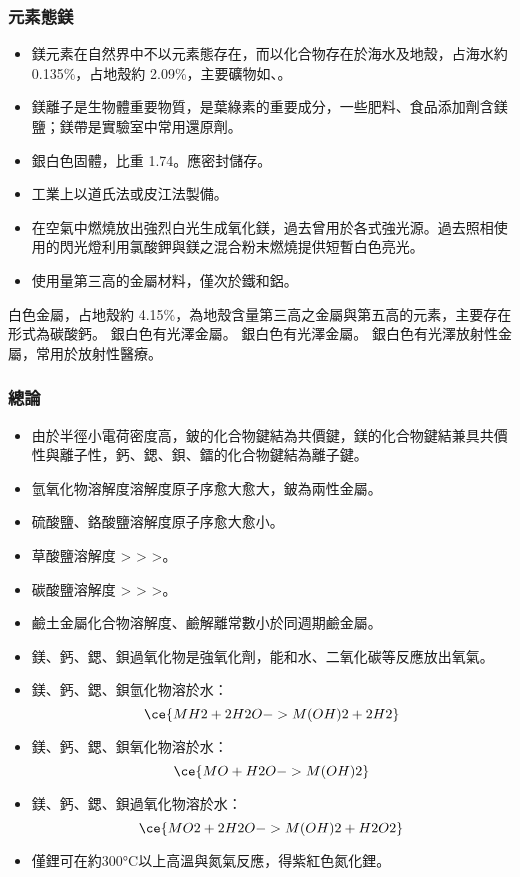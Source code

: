 \documentclass[a4paper,12pt]{report}
\begin{document}
\begin{itemize}
\begin{itemize}
\subsubsection{元素態鎂}
\begin{itemize}
\item 鎂元素在自然界中不以元素態存在，而以化合物存在於海水及地殼，占海水約 0.135\%，占地殼約 2.09\%，主要礦物如、。
\item 鎂離子是生物體重要物質，是葉綠素的重要成分，一些肥料、食品添加劑含鎂鹽；鎂帶是實驗室中常用還原劑。
\item 銀白色固體，比重 1.74。應密封儲存。
\item 工業上以道氏法或皮江法製備。
\item 在空氣中燃燒放出強烈白光生成氧化鎂，過去曾用於各式強光源。過去照相使用的閃光燈利用氯酸鉀與鎂之混合粉末燃燒提供短暫白色亮光。
\item 使用量第三高的金屬材料，僅次於鐵和鋁。
\end{itemize}
白色金屬，占地殼約 4.15\%，為地殼含量第三高之金屬與第五高的元素，主要存在形式為碳酸鈣。
銀白色有光澤金屬。
銀白色有光澤金屬。
銀白色有光澤放射性金屬，常用於放射性醫療。
\subsubsection{總論}
\begin{itemize}
\item 由於半徑小電荷密度高，鈹的化合物鍵結為共價鍵，鎂的化合物鍵結兼具共價性與離子性，鈣、鍶、鋇、鐳的化合物鍵結為離子鍵。
\item 氫氧化物溶解度溶解度原子序愈大愈大，鈹為兩性金屬。
\item 硫酸鹽、鉻酸鹽溶解度原子序愈大愈小。
\item 草酸鹽溶解度 > > >。
\item 碳酸鹽溶解度 > > >。
\item 鹼土金屬化合物溶解度、鹼解離常數小於同週期鹼金屬。
\item 鎂、鈣、鍶、鋇過氧化物是強氧化劑，能和水、二氧化碳等反應放出氧氣。
\item 鎂、鈣、鍶、鋇氫化物溶於水：
\[\ce{MH2 + 2H2O -> M(OH)2 + 2H2}\]
\item 鎂、鈣、鍶、鋇氧化物溶於水：
\[\ce{MO + H2O -> M(OH)2}\]
\item 鎂、鈣、鍶、鋇過氧化物溶於水：
\[\ce{MO2 + 2H2O -> M(OH)2 + H2O2}\]
\item 僅鋰可在約300°C以上高溫與氮氣反應，得紫紅色氮化鋰。
\end{itemize}

\end{itemize}
\end{itemize}
\end{document}

